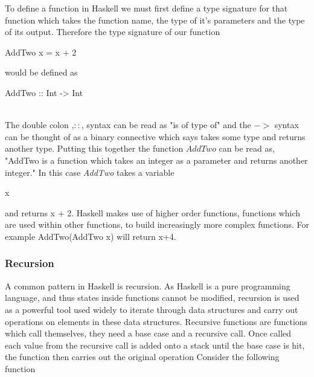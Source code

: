 \documentclass{article}%
\begin{document}
To define a function in Haskell we must first define a type signature for that function which takes the function name, the type of it's parameters and the type of its output. Therefore the type signature of our function\begin{myFunctionStyle}
AddTwo x = x + 2
\end{myFunctionStyle} would be defined as \\ \begin{myFunctionStyle}
AddTwo :: Int -> Int 
\end{myFunctionStyle}\\
The double colon ,$::$, syntax can be read as "is of type of" and the $->$ syntax can be thought of as a binary connective which says takes some type and returns another type. Putting this together the function $AddTwo$ can be read as, "AddTwo is a function which takes an integer as a parameter and returns another integer." 
In this case \textit{AddTwo} takes a variable \begin{myKeyWordStyle}{x}\end{myKeyWordStyle} and returns x + 2.
Haskell makes use of higher order functions, functions which are used within other functions, to build increasingly more complex functions. 
For example AddTwo(AddTwo x) will return x+4. 
\subsubsection{Recursion}
A common pattern in Haskell is recursion. As Haskell is a pure programming language, and thus states inside functions cannot be modified, recursion is used as a powerful tool used widely to iterate through data structures and carry out operations on elements in these data structures. Recursive functions are functions which call themselves, they need a base case and a recursive call. Once called each value from the recursive call is added onto a stack until the base case is hit, the function then carries out the original operation 
Consider the following function 
\end{document}
